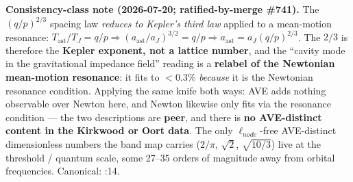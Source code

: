 \noindent\textbf{Consistency-class note (2026-07-20; ratified-by-merge
\#741).}  The $(q/p)^{2/3}$ spacing law \emph{reduces to Kepler's third
law} applied to a mean-motion resonance:
$T_{\text{ast}}/T_J = q/p \Rightarrow (a_{\text{ast}}/a_J)^{3/2} = q/p
\Rightarrow a_{\text{ast}} = a_J (q/p)^{2/3}$.  The $2/3$ is therefore the
\textbf{Kepler exponent, not a lattice number}, and the ``cavity mode in
the gravitational impedance field'' reading is a \textbf{relabel of the
Newtonian mean-motion resonance}: it fits to $< 0.3\%$ \emph{because} it is
the Newtonian resonance condition.  Applying the same knife both ways: AVE
adds nothing observable over Newton here, and Newton likewise only fits via
the resonance condition --- the two descriptions are \textbf{peer}, and
there is \textbf{no AVE-distinct content in the Kirkwood or Oort data}.  The
only $\ell_{node}$-free AVE-distinct dimensionless numbers the band map
carries ($2/\pi$, $\sqrt{2}$, $\sqrt{10/3}$) live at the threshold /
quantum scale, some 27--35 orders of magnitude away from orbital
frequencies.  Canonical:
:14.

